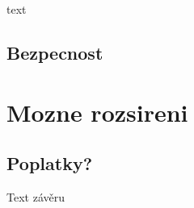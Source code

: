 text

\subsection{Bezpecnost}

\section{Mozne rozsireni}\label{sec:NextSteps}
\subsection{Poplatky?}

Text závěru





